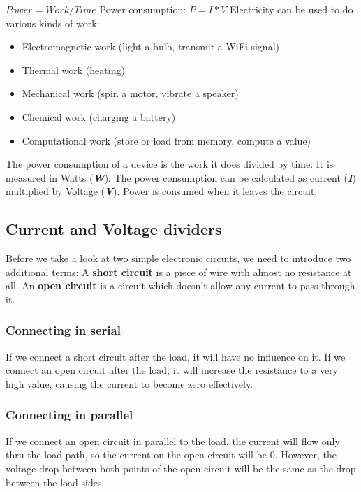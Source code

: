 $Power = Work / Time$
\newline
Power consumption: $P=I*V$
\newline
Electricity can be used to do various kinds of work:
\begin{itemize}
    \item Electromagnetic work (light a bulb, transmit a WiFi signal)
    \item Thermal work (heating)
    \item Mechanical work (spin a motor, vibrate a speaker)
    \item Chemical work (charging a battery)
    \item Computational work (store or load from memory, compute a value)
\end{itemize}

The power consumption of a device is the work it does divided by time.
It is measured in Watts (\textbf{\textit{W}}).
The power consumption can be calculated as current (\textbf{\textit{I}})
multiplied by Voltage (\textbf{\textit{V}}).
Power is consumed when it leaves the circuit.

\subsection{Current and Voltage dividers}
Before we take a look at two simple electronic circuits, we need to
introduce two additional terms:
A \textbf{short circuit} is a piece of wire with almost no resistance at all.
An \textbf{open circuit} is a circuit which doesn't allow any
current to pass through it.

\subsubsection{Connecting in serial}
If we connect a short circuit after the load, it will have no influence on it.
If we connect an open circuit after the load, it will increase the resistance
to a very high value, causing the current to become zero effectively.

\subsubsection{Connecting in parallel}
If we connect an open circuit in parallel to the load, the current will flow only thru the load path,
so the current on the open circuit will be 0.
However, the voltage drop between both points of the open circuit will be the same as the drop between
the load sides.

